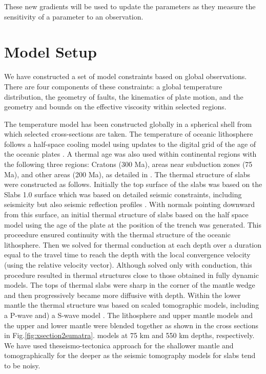 \documentclass[12pt]{article}
\begin{document}
These new gradients will be used to update the parameters as they measure the sensitivity of a parameter to an observation.

\section{Model Setup}
We have constructed a set of model constraints based on global observations. There are four components of these constraints: a global temperature distribution, the geometry of faults, the kinematics of plate motion, and the geometry and bounds on the effective viscosity within selected regions.

The temperature model has been constructed globally in a spherical shell from which  selected cross-sections are taken. The temperature of oceanic lithosphere follows a half-space cooling model using  updates to the digital grid of the age of the oceanic plates \citep{muller1997digital}.  
A thermal age was also used within continental regions with the following three regions: Cratons (300 Ma), areas near subduction zones (75 Ma), and other areas (200 Ma), as detailed in \citep{Stadler27082010}.
The thermal structure of slabs were constructed as follows. 
Initially the top surface of the slabs was based on the Slabs 1.0 surface which was based on detailed seismic constraints, including seismicity but also seismic reflection profiles \citep{Hayes2012}.
With normals pointing downward from this surface, an initial thermal structure of slabs based on the half space model using the age of the plate at the position of the trench was generated. This proceedure ensured continuity with the thermal structure of the oceanic lithosphere. Then we solved for thermal conduction at each depth over a duration equal to the travel time to reach the depth with the local convergence velocity (using the relative velocity vector). Although solved only with conduction, this procedure resulted in thermal structures close to those obtained in fully dynamic models. The tops of thermal  slabs were sharp in the corner of the mantle wedge and then progressively became more diffusive with depth.
Within the lower mantle the thermal structure was based on scaled tomographic models,
including a P-wave\citep{simmons2012llnl} and) a S-wave model \citep{ritsema1999complex}.
The lithosphere and upper mantle models and the upper and lower mantle were blended together as shown in the cross sections in Fig.\ref{fig:xsection2sumatra}.
models at 75 km and 550 km depths, respectively. We have used theseismo-tectonica approach for the shallower mantle and tomographically for the deeper as the seismic tomography models for slabs tend to be noisy.
\end{document}
